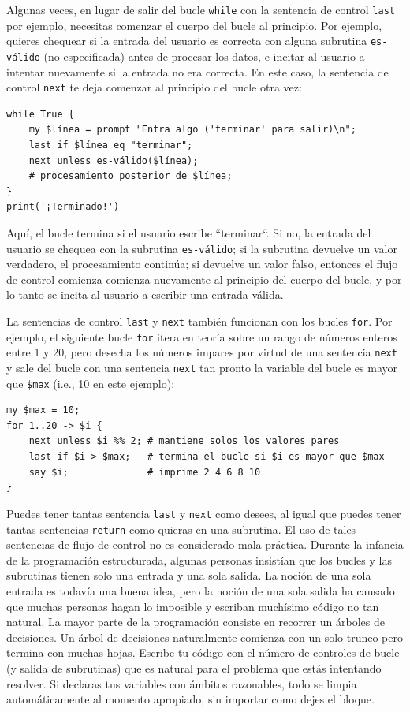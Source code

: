 Algunas veces, en lugar de salir del bucle {\tt while} con la 
sentencia de control {\tt last} por ejemplo, necesitas comenzar
el cuerpo del bucle al principio. Por ejemplo, quieres
chequear si la entrada del usuario es correcta con alguna
subrutina {\tt es-válido} (no especificada) antes de procesar los datos,
e incitar al usuario a intentar nuevamente si la entrada 
no era correcta. En este caso, la sentencia de control {\tt next}
te deja comenzar al principio del bucle otra vez:

\begin{verbatim}
while True {
    my $línea = prompt "Entra algo ('terminar' para salir)\n";
    last if $línea eq "terminar";
    next unless es-válido($línea);
    # procesamiento posterior de $línea;
}
print('¡Terminado!')
\end{verbatim}
%
Aquí, el bucle termina si el usuario escribe ``terminar``. Si no,
la entrada del usuario se chequea con la subrutina {\tt es-válido};
si la subrutina devuelve un valor verdadero, el procesamiento 
continúa; si devuelve un valor falso, entonces el flujo de control 
comienza comienza nuevamente al principio del cuerpo del bucle,
y por lo tanto se incita al usuario a escribir una entrada válida.

La sentencias de control {\tt last} y {\tt next} también funcionan
con los bucles {\tt for}. Por ejemplo, el siguiente bucle {\tt for}
itera en teoría sobre un rango de números enteros entre 1 y 20,
pero desecha los números impares por virtud de una sentencia {\tt next}
y sale del bucle con una sentencia {\tt next} tan pronto la variable del
bucle es mayor que {\tt \$max} (i.e., 10 en este ejemplo):

\begin{verbatim}
my $max = 10;
for 1..20 -> $i {
    next unless $i %% 2; # mantiene solos los valores pares
    last if $i > $max;   # termina el bucle si $i es mayor que $max
    say $i;              # imprime 2 4 6 8 10
}
\end{verbatim}

Puedes tener tantas sentencia {\tt last} y {\tt next} como desees,
al igual que puedes tener tantas sentencias {\tt return} como quieras
en una subrutina. El uso de tales sentencias de flujo de control no
es considerado mala práctica. Durante la infancia de la programación 
estructurada, algunas personas insistían que los bucles y las subrutinas
tienen solo una entrada y una sola salida. La noción de una sola entrada
es todavía una buena idea, pero la noción de una sola salida ha causado que 
muchas personas hagan lo imposible y escriban muchísimo código no tan natural.
La mayor parte de la programación consiste en recorrer un árboles de
decisiones. Un árbol de decisiones naturalmente comienza con un solo trunco 
pero termina con muchas hojas. Escribe tu código con el número de 
controles de bucle (y salida de subrutinas) que es natural para el 
problema que estás intentando resolver. Si declaras tus variables con ámbitos
razonables, todo se limpia automáticamente al momento apropiado, sin importar
como dejes el bloque.

